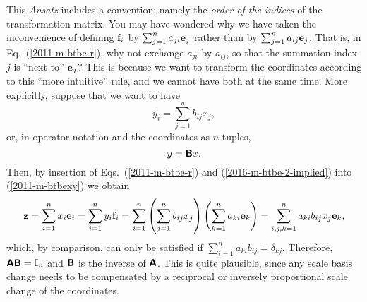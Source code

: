 This {\it Ansatz} includes a convention; namely the {\em order of the indices} of the transformation matrix.
You may have wondered why we have taken the inconvenience of defining
${\bf f}_i$ by $\sum_{j=1}^n a_{ji} {\bf e}_j$ rather than by $\sum_{j=1}^n a_{ij} {\bf e}_j$.
That is, in  Eq.~(\ref{2011-m-btbe-r}), why not exchange $a_{ji}$ by $a_{ij}$,
so that the summation index $j$ is ``next to'' ${\bf e}_j$?
This is because we want to transform the coordinates according to this ``more intuitive'' rule, and we cannot have both
at the same time.
More explicitly, suppose that we want to have
\begin{equation}
y_i =\sum_{j=1}^n b_{ij} x_j
,
\label{2016-m-btbe-2-implied}
\end{equation}
or, in operator notation and the coordinates as $n$-tuples,
\begin{equation}
y = \textsf{\textbf{B}} x
.
\label{2016-m-btbe-2-impliedm}
\end{equation}
Then, by insertion of  Eqs.~(\ref{2011-m-btbe-r}) and (\ref{2016-m-btbe-2-implied}) into (\ref{2011-m-btbexy})
we obtain
\begin{equation}
{\bf z}=
\sum_{i=1}^n x_i{\bf e}_i
=
\sum_{i=1}^n  y_i{\bf f}_i
= \sum_{i=1}^n \left( \sum_{j=1}^n b_{ij} x_j \right)   \left( \sum_{k=1}^n a_{ki} {\bf e}_k \right)
= \sum_{i,j,k=1}^n  a_{ki} b_{ij}  x_j {\bf e}_k
,
\label{2016-m-btbexy}
\end{equation}
which, by comparison, can only be satisfied if  $\sum_{i=1}^n  a_{ki} b_{ij} = \delta_{kj}$.
Therefore, $\textsf{\textbf{A}}\textsf{\textbf{B}} = {\Bbb I}_n$ and
$\textsf{\textbf{B}}$   is the inverse of
$\textsf{\textbf{A}}$.
This is quite plausible, since any scale basis change needs to be compensated by a reciprocal or inversely proportional
scale change of the coordinates.




